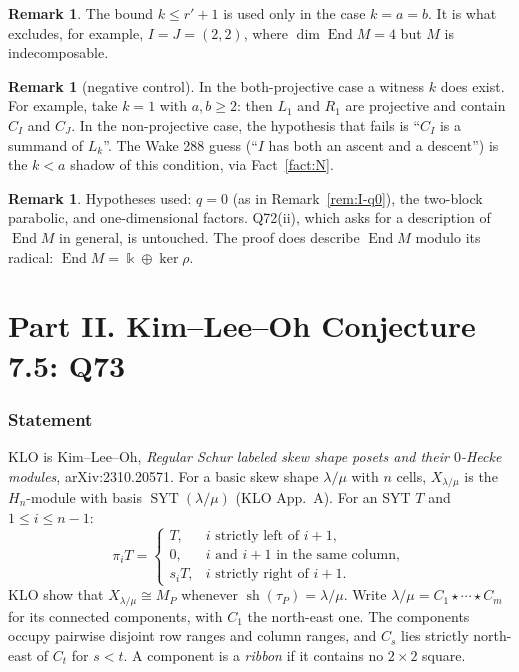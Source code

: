 \documentclass[11pt]{amsart}
\newcommand{\End}{\operatorname{End}}
\newcommand{\SYT}{\operatorname{SYT}}
\newcommand{\kk}{\Bbbk}
\theoremstyle{plain}
\theoremstyle{definition}
\newtheorem{remark}[lemma]{Remark}
\begin{document}
\begin{remark}
The bound $k\le r'+1$ is used only in the case $k=a=b$. It is what excludes, for example, $I=J=(2,2)$, where $\dim\End M=4$ but $M$ is indecomposable.
\end{remark}

\begin{remark}[negative control]
In the both-projective case a witness $k$ does exist. For example, take $k=1$ with $a,b\ge2$: then $L_1$ and $R_1$ are projective and contain $C_I$ and $C_J$. In the non-projective case, the hypothesis that fails is ``$C_I$ is a summand of $L_k$''. The Wake 288 guess (``$I$ has both an ascent and a descent'') is the $k<a$ shadow of this condition, via Fact~\ref{fact:N}.
\end{remark}

\begin{remark}
Hypotheses used: $q=0$ (as in Remark~\ref{rem:I-q0}), the two-block parabolic, and one-dimensional factors. Q72(ii), which asks for a description of $\End M$ in general, is untouched. The proof does describe $\End M$ modulo its radical: $\End M=\kk\oplus\ker\rho$.
\end{remark}

\part*{Part II. Kim--Lee--Oh Conjecture 7.5: Q73}

\section{Statement}

KLO is Kim--Lee--Oh, \emph{Regular Schur labeled skew shape posets and their $0$-Hecke modules}, arXiv:2310.20571. For a basic skew shape $\lambda/\mu$ with $n$ cells, $X_{\lambda/\mu}$ is the $H_n$-module with basis $\SYT(\lambda/\mu)$ (KLO App.~A). For an SYT $T$ and $1\le i\le n-1$:
\[
\pi_iT=\begin{cases}T,& i\text{ strictly left of }i+1,\\ 0,& i\text{ and }i+1\text{ in the same column},\\ s_iT,& i\text{ strictly right of }i+1.\end{cases}
\]
KLO show that $X_{\lambda/\mu}\cong M_P$ whenever $\operatorname{sh}(\tau_P)=\lambda/\mu$. Write $\lambda/\mu=C_1\star\cdots\star C_m$ for its connected components, with $C_1$ the north-east one. The components occupy pairwise disjoint row ranges and column ranges, and $C_s$ lies strictly north-east of $C_t$ for $s<t$. A component is a \emph{ribbon} if it contains no $2\times2$ square.
\end{document}

